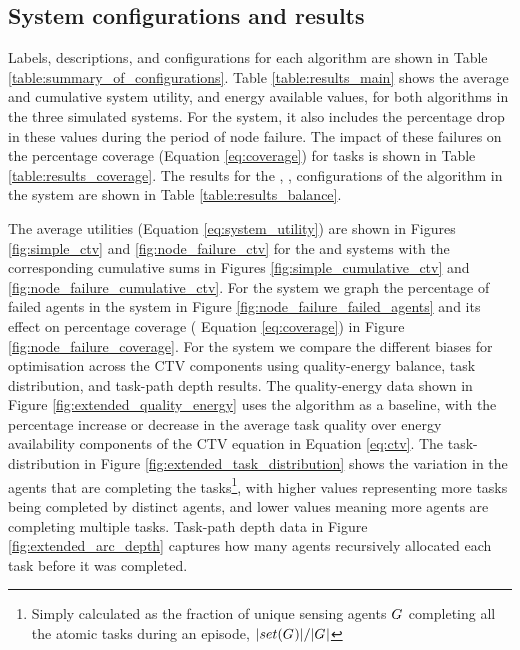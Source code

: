 \subsection{System configurations and results}
Labels, descriptions, and configurations for each algorithm are shown in Table \ref{table:summary_of_configurations}. Table \ref{table:results_main} shows the average and cumulative system utility, and energy available values, for both algorithms in the three simulated systems. For the \simulationNodeFailure{}{} system, it also includes the percentage drop in these values during the period of node failure. The impact of these failures on the percentage coverage (Equation \ref{eq:coverage}) for tasks is shown in Table \ref{table:results_coverage}. The results for the \algorithmEnergy{}{}, \algorithmQuality{}{}, \algorithmDistribution{}{} configurations of the \acronymWSNOptimisation{}{} algorithm in the \simulationExtended{}{} system are shown in Table \ref{table:results_balance}. 

The average utilities  (Equation \ref{eq:system_utility}) are shown in Figures \ref{fig:simple_ctv} and \ref{fig:node_failure_ctv} for the \simulationSimple{}{} and \simulationNodeFailure{}{} systems with the corresponding cumulative sums in Figures \ref{fig:simple_cumulative_ctv} and \ref{fig:node_failure_cumulative_ctv}. For the \simulationNodeFailure{}{} system we graph the percentage of failed agents in the system in Figure \ref{fig:node_failure_failed_agents} and its effect on percentage coverage (	Equation \ref{eq:coverage}) in Figure \ref{fig:node_failure_coverage}.  For the \simulationExtended{}{} system we compare the different biases for optimisation across the CTV components using quality-energy balance, task distribution, and task-path depth results. The quality-energy data shown in Figure \ref{fig:extended_quality_energy} uses the \algorithmEnergy{}{} algorithm as a baseline, with the percentage increase or decrease in the average task quality over energy availability components of the CTV equation in Equation \ref{eq:ctv}. The task-distribution in Figure \ref{fig:extended_task_distribution} shows the variation in the agents that are completing the tasks\footnote{ Simply calculated as the fraction of unique sensing agents $G_{}^{}$ completing all the atomic tasks during an episode, $\lvert set(G_{}^{}) \rvert{}/\lvert G_{}^{} \rvert{}$}, with higher values representing more tasks being completed by distinct agents, and lower values meaning more agents are completing multiple tasks. Task-path depth data in Figure \ref{fig:extended_arc_depth} captures how many agents recursively allocated each task before it was completed.